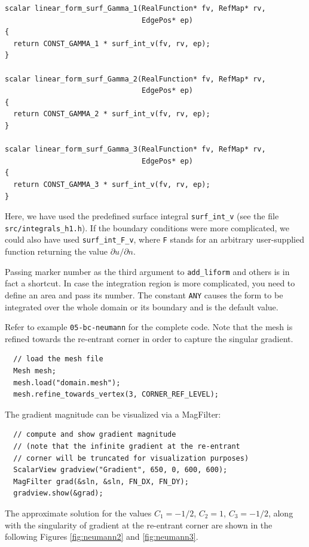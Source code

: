 \documentclass[11pt]{article}
\begin{document}
\begin{lstlisting}
scalar linear_form_surf_Gamma_1(RealFunction* fv, RefMap* rv,
                                EdgePos* ep)
{
  return CONST_GAMMA_1 * surf_int_v(fv, rv, ep);
}

scalar linear_form_surf_Gamma_2(RealFunction* fv, RefMap* rv,
                                EdgePos* ep)
{
  return CONST_GAMMA_2 * surf_int_v(fv, rv, ep);
}

scalar linear_form_surf_Gamma_3(RealFunction* fv, RefMap* rv,
                                EdgePos* ep)
{
  return CONST_GAMMA_3 * surf_int_v(fv, rv, ep);
}
\end{lstlisting}

Here, we have used the predefined surface integral \verb"surf_int_v" (see the
file {\tt src/integrals\_h1.h}). If the boundary conditions were more complicated, we could also
have used \verb"surf_int_F_v", where {\tt F} stands for an arbitrary user-supplied
function returning the value $\partial u/\partial n$.

Passing marker number as the third argument to {\tt add\_liform} and others is
in fact a shortcut. In case the integration region is more complicated,
you need to define an area
and pass its number.
The constant {\tt ANY} causes the form to be integrated over the whole domain
or its boundary and is the default value.

Refer to example {\tt 05-bc-neumann} for the complete code. Note that the mesh
is refined towards the re-entrant corner in order to capture the singular
gradient.

\begin{lstlisting}
  // load the mesh file
  Mesh mesh;
  mesh.load("domain.mesh");
  mesh.refine_towards_vertex(3, CORNER_REF_LEVEL);
\end{lstlisting}

The gradient magnitude can be visualized via a MagFilter:

\begin{lstlisting}
  // compute and show gradient magnitude
  // (note that the infinite gradient at the re-entrant
  // corner will be truncated for visualization purposes)
  ScalarView gradview("Gradient", 650, 0, 600, 600);
  MagFilter grad(&sln, &sln, FN_DX, FN_DY);
  gradview.show(&grad);
\end{lstlisting}

The approximate solution for the values $C_1 = -1/2$, $C_2 = 1$, $C_3 = -1/2$,
along with the singularity of gradient at the re-entrant corner are
shown in the following Figures \ref{fig:neumann2} and \ref{fig:neumann3}.
\end{document}
